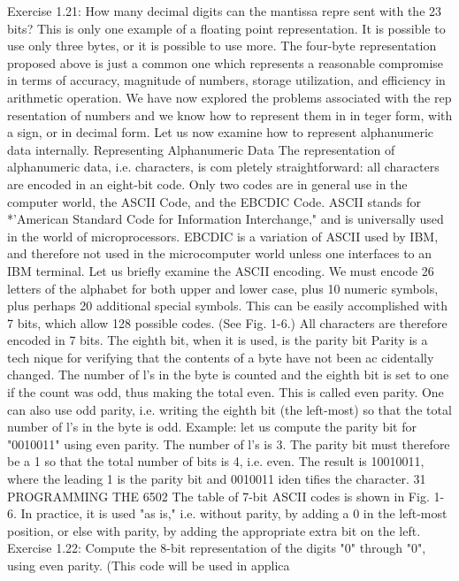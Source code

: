 \documentclass{book}
\begin{document}
Exercise 1.21: How many decimal digits can the mantissa repre
sent with the 23 bits?
This is only one example of a floating point representation. It is
possible to use only three bytes, or it is possible to use more. The
four-byte representation proposed above is just a common one
which represents a reasonable compromise in terms of accuracy,
magnitude of numbers, storage utilization, and efficiency in
arithmetic operation.
We have now explored the problems associated with the rep
resentation of numbers and we know how to represent them in in
teger form, with a sign, or in decimal form. Let us now examine
how to represent alphanumeric data internally.
Representing Alphanumeric Data
The representation of alphanumeric data, i.e. characters, is com
pletely straightforward: all characters are encoded in an eight-bit
code. Only two codes are in general use in the computer world, the
ASCII Code, and the EBCDIC Code. ASCII stands for *'American
Standard Code for Information Interchange," and is universally
used in the world of microprocessors. EBCDIC is a variation of
ASCII used by IBM, and therefore not used in the microcomputer
world unless one interfaces to an IBM terminal.
Let us briefly examine the ASCII encoding. We must encode 26
letters of the alphabet for both upper and lower case, plus 10
numeric symbols, plus perhaps 20 additional special symbols. This
can be easily accomplished with 7 bits, which allow 128 possible
codes. (See Fig. 1-6.) All characters are therefore encoded in 7 bits.
The eighth bit, when it is used, is the parity bit Parity is a tech
nique for verifying that the contents of a byte have not been ac
cidentally changed. The number of l's in the byte is counted and
the eighth bit is set to one if the count was odd, thus making the
total even. This is called even parity. One can also use odd parity,
i.e. writing the eighth bit (the left-most) so that the total number of
l's in the byte is odd.
Example: let us compute the parity bit for "0010011" using even
parity. The number of l's is 3. The parity bit must therefore be a 1
so that the total number of bits is 4, i.e. even. The result is
10010011, where the leading 1 is the parity bit and 0010011 iden
tifies the character.
31
PROGRAMMING THE 6502
The table of 7-bit ASCII codes is shown in Fig. 1-6. In practice, it
is used "as is," i.e. without parity, by adding a 0 in the left-most
position, or else with parity, by adding the appropriate extra bit on
the left.
Exercise 1.22: Compute the 8-bit representation of the digits "0"
through "0", using even parity. (This code will be used in applica
\end{document}
